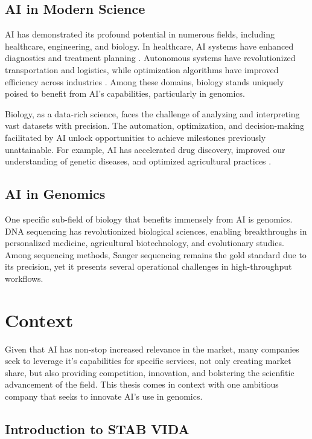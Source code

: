 \subsection{AI in Modern Science}
AI has demonstrated its profound potential in numerous fields, including healthcare, engineering, and biology. In healthcare, AI systems have enhanced diagnostics and treatment planning \cite{esteva2017dermatologist}. Autonomous systems have revolutionized transportation and logistics, while optimization algorithms have improved efficiency across industries \cite{russell2010artificial}. Among these domains, biology stands uniquely poised to benefit from AI’s capabilities, particularly in genomics.

Biology, as a data-rich science, faces the challenge of analyzing and interpreting vast datasets with precision. The automation, optimization, and decision-making facilitated by AI unlock opportunities to achieve milestones previously unattainable. For example, AI has accelerated drug discovery, improved our understanding of genetic diseases, and optimized agricultural practices \cite{senior2020protein, jumper2021highly}.

\subsection{AI in Genomics}
One specific sub-field of biology that benefits immensely from AI is genomics. DNA sequencing has revolutionized biological sciences, enabling breakthroughs in personalized medicine, agricultural biotechnology, and evolutionary studies. Among sequencing methods, Sanger sequencing remains the gold standard due to its precision, yet it presents several operational challenges in high-throughput workflows.

\section{Context}
\label{sec:Context}

Given that AI has non-stop increased relevance in the market, many companies seek to leverage it's capabilities for specific services, not only creating market share, but also providing competition, innovation, and bolstering the scienfitic advancement of the field.
This thesis comes in context with one ambitious company that seeks to innovate AI's use in genomics.

\subsection{Introduction to STAB VIDA}

